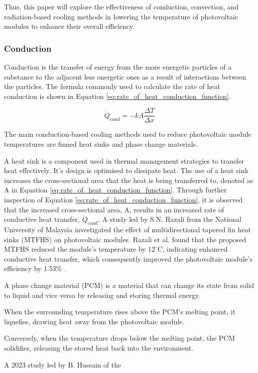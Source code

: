 \noindent Thus, this paper will explore the effectiveness of conduction, convection, and radiation-based cooling methods in lowering the temperature of photovoltaic modules to enhance their overall efficiency.\par

\subsubsection{Conduction} %
\noindent Conduction is the transfer of energy from the more energetic particles of a substance to the adjacent less energetic ones as a result of interactions between the particles. The formula commonly used to calculate the rate of heat conduction is shown in Equation \ref{eq:rate_of_heat_conduction_function}. \cite{Cengel2014HeatApplications}\par

\begin{equation}
    \dot{Q}_\text{cond} = -kA\frac{\Delta T}{\Delta x}
    \label{eq:rate_of_heat_conduction_function}
\end{equation}

\noindent The main conduction-based cooling methods used to reduce photovoltaic module temperatures are finned heat sinks and phase change materials.\vspace{0.5em}

\noindent A heat sink is a component used in thermal management strategies to transfer heat effectively. It's design is optimised to dissipate heat. \cite{Kumar2024QualitativeReview} The use of a heat sink increases the cross-sectional area that the heat is being transferred to, denoted as A in Equation \ref{eq:rate_of_heat_conduction_function}. Through further inspection of Equation \ref{eq:rate_of_heat_conduction_function}, it is observed that the increased cross-sectional area, A, results in an increased rate of conductive heat transfer, $\dot{Q}_\text{cond}$. A study led by S.N. Razali from the National University of Malaysia investigated the effect of multidirectional tapered fin heat sinks (MTFHS) on photovoltaic modules. Razali et al. found that the proposed MTFHS reduced the module's temperature by $12^\circ \text{C}$, indicating enhanced conductive heat transfer, which consequently improved the photovoltaic module's efficiency by 1.53\% \cite{Razali2023PerformanceMTFHS}.\vspace{0.5em}

\noindent A phase change material (PCM) is a material that can change its state from solid to liquid and vice versa by releasing and storing thermal energy. \cite{Nicholas2019ActivatedMaterial}\par
\noindent When the surrounding temperature rises above the PCM’s melting point, it liquefies, drawing heat away from the photovoltaic module.\par
\noindent Conversely, when the temperature drops below the melting point, the PCM solidifies, releasing the stored heat back into the environment.\par
\noindent A 2023 study led by B. Hussain of the \par

